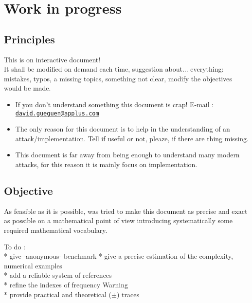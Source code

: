 \newpage
\section{Work in progress}

\subsection{Principles}
This is on interactive document!\\

It shall be modified on demand each time, suggestion about... everything:
mistakes, typos, a missing topics, something not clear, modify the objectives would be made. 
\begin{itemize}
\item If you don't understand something this document is crap!
	E-mail \Letter: 
	\href{
		mailto:David Gueguen <david.gueguen@applus.com>;david.gueguen@applus.com}{
		\nolinkurl{david.gueguen@applus.com}
		}\\
\item The only reason for this document is to help in the understanding of an
	 attack/implementation. Tell if useful or not, pleaze, if there are thing missing.
	 
\item This document is far away from being enough to understand many modern attacks,
	for this reason it is mainly focus on implementation.
	
\end{itemize}

\subsection{Objective}
As feasible as it is possible, was tried to make this document as precise and exact as possible 
on a mathematical point of view introducing systematically some required mathematical vocabulary. 

To do :\\
*  give -anonymous- benchmark
*  give a precise estimation of the complexity, numerical examples\\
*  add a reliable system of references\\
*  refine the indexes of frequency Warning\\
*  provide practical and theoretical ($\pm$) traces 



